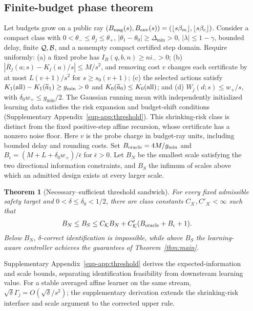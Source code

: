 \documentclass[journal]{IEEEtran}
\newtheorem{theorem}{Theorem}
\begin{document}
\subsection{Finite-budget phase theorem}
Let budgets grow on a public ray $(B_{\rm msg}(s),B_{\rm env}(s))=(\lfloor s\beta_m\rfloor,\lfloor s\beta_e\rfloor)$.
Consider a compact class with $0<\theta_-\le\theta_j\le\theta_+$, $|\theta_1-\theta_0|\ge\Delta_{\min}>0$, $|\lambda|\le1-\gamma$, bounded delay, finite ${\cal Q},{\cal B}$, and a nonempty compact certified step domain.
Require uniformly: (a) a fixed probe has $I_B(q,b,n)\ge ni_->0$; (b) $|\overline R_j(a;s)-K_j(a)/s|\le M/s^2$, and removing cost $v$ changes each certificate by at most $L(v+1)/s^2$ for $s\ge s_0(v+1)$; (c) the selected actions satisfy $K_1({\rm all})-K_1(\widetilde a_1)\ge g_{\min}>0$ and $K_0(\widetilde a_0)\le K_0({\rm all})$; and (d) $W_j(d;s)\le w_+/s$, with $\delta_0w_+\le g_{\min}/2$.
The Gaussian running mean with independently initialized learning data satisfies the risk expansion and budget-shift conditions (Supplementary Appendix~\ref{sup-app:threshold}).
This shrinking-risk class is distinct from the fixed positive-step affine recursion, whose certificate has a nonzero noise floor.
Here $v$ is the probe charge in budget-ray units, including bounded delay and rounding costs.
Set $B_{\rm oracle}=4M/g_{\min}$ and $B_\epsilon=(M+L+\delta_0w_+)/\bar\epsilon$ for $\bar\epsilon>0$.
Let $B_N$ be the smallest scale satisfying the two directional information constraints, and $B_S$ the infimum of scales above which an admitted design exists at every larger scale.

\begin{theorem}[Necessary--sufficient threshold sandwich]
For every fixed admissible safety target and $0<\delta\le\delta_0<1/2$, there are class constants $C_{\mathcal K},C'_{\mathcal K}<\infty$ such that
\begin{equation}
B_N\le B_S\le C_{\mathcal K}B_N+C'_{\mathcal K}(B_{\rm oracle}+B_\epsilon+1).
\label{eq:threshold-sandwich}
\end{equation}
Below $B_N$, $\delta$-correct identification is impossible, while above $B_S$ the learning-aware controller achieves the guarantees of Theorem~\ref{thm:main}.
\label{thm:sandwich}
\end{theorem}
Supplementary Appendix~\ref{sup-app:threshold} derives the expected-information and scale bounds, separating identification feasibility from downstream learning value.
For a stable averaged affine learner on the same stream, $\sqrt\delta\Gamma_j=O(\sqrt\delta/s^2)$; the supplementary derivation extends the shrinking-risk interface and scale argument to the corrected upper rule.
\end{document}
